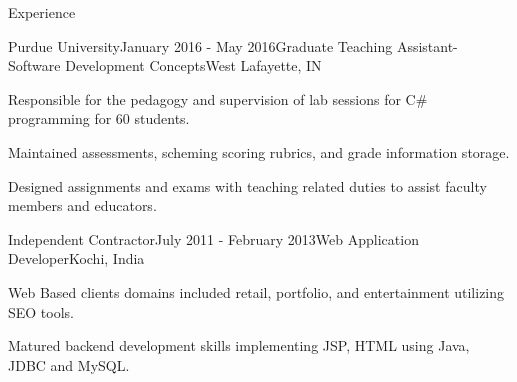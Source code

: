\documentclass{resume} %
\begin{document}
\begin{rSection}{Experience}

\begin{rSubsection}{Purdue University}{January 2016 - May 2016}{Graduate Teaching Assistant- Software Development Concepts}{West Lafayette, IN}
\item Responsible for the pedagogy and supervision of lab sessions for C\# programming for 60 students.
\item Maintained assessments, scheming scoring rubrics, and grade information storage.
\item Designed assignments and exams with teaching related duties to assist faculty members and educators.
\end{rSubsection}


\begin{rSubsection}{Independent Contractor}{July 2011 - February 2013}{Web Application Developer}{Kochi, India}
\item Web Based clients domains included retail, portfolio, and entertainment utilizing SEO tools.
\item Matured backend development skills implementing JSP, HTML using Java, JDBC and MySQL.
\end{rSubsection}

\end{rSection}


\end{document}
